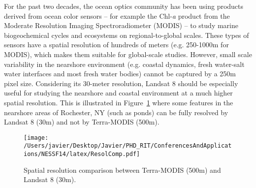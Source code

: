 \documentclass{article}
\begin{document}
For the past two decades, the ocean optics community has been using products derived from ocean color sensors -- for example the Chl-{\it a} product from the Moderate Resolution Imaging Spectroradiometer (MODIS) -- to study marine biogeochemical cycles and ecosystems on regional-to-global scales. These types of sensors have a spatial resolution of hundreds of meters (e.g. 250-1000m for MODIS), which makes them suitable for global-scale studies. However, small scale variability in the nearshore environment (e.g. coastal dynamics, fresh water-salt water interfaces and most fresh water bodies) cannot be captured by a 250m pixel size. Considering its 30-meter resolution, Landsat 8 should be especially useful for studying the nearshore and coastal environment at a much higher spatial resolution. This is illustrated in Figure~\ref{fig:resol} where some features in the nearshore areas of Rochester, NY (such as ponds) can be fully resolved by Landsat 8 (30m) and not by Terra-MODIS (500m).
\begin{figure}[htb]
  \centering
  \texttt{[image: /Users/javier/Desktop/Javier/PHD\_RIT/ConferencesAndApplications/NESSF14/latex/ResolComp.pdf]}
  \caption{Spatial resolution comparison between Terra-MODIS (500m) and Landsat 8 (30m). \label{fig:resol} } 
\end{figure}
\end{document}

